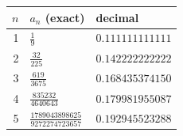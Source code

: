 \begin{tabular}{rll}
\toprule
$n$ & $a_n$ (exact) & decimal \\
\midrule
1 & $\frac{1}{9}$ & $0.111111111111$ \\
2 & $\frac{32}{225}$ & $0.142222222222$ \\
3 & $\frac{619}{3675}$ & $0.168435374150$ \\
4 & $\frac{835232}{4640643}$ & $0.179981955087$ \\
5 & $\frac{1789043898625}{9272274723657}$ & $0.192945523288$ \\
\bottomrule
\end{tabular}
